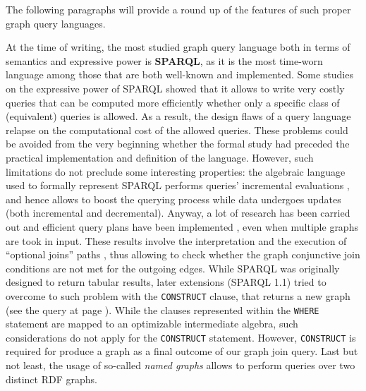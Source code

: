 The following paragraphs will provide a round up of the features of such proper graph query languages.




At the time of writing, the most studied graph query language  both in terms of
semantics and expressive power is \textbf{SPARQL}, as it is the most time-worn language among those that are both well-known
and implemented. Some studies on the expressive power of SPARQL \cite{SparQLExpr,Perez2009} showed that
it allows to write very costly queries that can be computed more
efficiently whether only a specific class of (equivalent) queries is allowed. As a result, the design flaws
of a query language relapse on the computational cost of the allowed queries. These problems could be avoided
from the very beginning whether the formal study had preceded the practical implementation and definition of the language.
However, such limitations do not preclude some interesting properties: the algebraic language used to
formally represent SPARQL performs queries' incremental evaluations \cite{SparqlIncr}, and hence
allows to boost the querying process while data undergoes updates (both incremental and decremental).
Anyway, a lot of research has been carried out \cite{Perez2009} and efficient query plans have been implemented \cite{sparqlScalable}, even when multiple
graphs are took in input.
These results involve the interpretation and the  execution of ``optional  joins''  paths \cite{SIGMOD2015Atre},
thus allowing to check whether the graph conjunctive join conditions are not met for the outgoing edges.
While SPARQL was originally designed to return tabular results,
later extensions (SPARQL 1.1) tried to overcome to such problem with the \texttt{CONSTRUCT} clause,
that returns a new graph (see the query at page \pageref{sqlrefch3}).
While the clauses represented within the \texttt{WHERE} statement are mapped to an optimizable intermediate algebra, such considerations do not apply for the \texttt{CONSTRUCT} statement.
However, \texttt{CONSTRUCT} is required for produce a graph as a final outcome of our
graph join query.
Last but not least, the usage of so-called \textit{named graphs}
allows to perform queries over two distinct RDF graphs.

